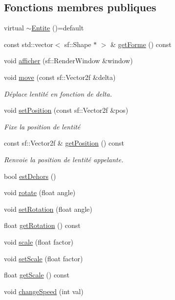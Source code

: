 \subsection*{Fonctions membres publiques}
\begin{DoxyCompactItemize}
\item 
virtual \hyperlink{class_entite_ace3b4604920a7aeba25efb60590e64cb}{$\sim$\+Entite} ()=default
\item 
const std\+::vector$<$ sf\+::\+Shape $\ast$ $>$ \& \hyperlink{class_entite_a0fccfa39c6be09c5ea63fb999fef4c8e}{get\+Forme} () const
\item 
void \hyperlink{class_entite_ad80a88f81ccc689b9abdfa75bd1e99d6}{afficher} (sf\+::\+Render\+Window \&window)
\item 
void \hyperlink{class_entite_ac409613f3cf67cae14babd4b16811c8f}{move} (const sf\+::\+Vector2f \&delta)
\begin{DoxyCompactList}\small\item\em Déplace l\textquotesingle{}entité en fonction de {\itshape delta}. \end{DoxyCompactList}\item 
void \hyperlink{class_entite_aa7fe4a7ebd8eb4c80ef9fdb7d97f2dad}{set\+Position} (const sf\+::\+Vector2f \&pos)
\begin{DoxyCompactList}\small\item\em Fixe la position de l\textquotesingle{}entité \end{DoxyCompactList}\item 
const sf\+::\+Vector2f \& \hyperlink{class_entite_a6f6fd1e1f9f6ad44f0ecc74961a774d9}{get\+Position} () const
\begin{DoxyCompactList}\small\item\em Renvoie la position de l\textquotesingle{}entité appelante. \end{DoxyCompactList}\item 
bool \hyperlink{class_entite_a4d38790ebb4bf082e20e47355a7b2f0c}{est\+Dehors} ()
\item 
void \hyperlink{class_entite_a620502288a6a0fc619eb4cab0fbe2289}{rotate} (float angle)
\item 
void \hyperlink{class_entite_acefaaf63dfe743c73fba1e6143015827}{set\+Rotation} (float angle)
\item 
float \hyperlink{class_entite_af245a50c73da19510d9a9e52cb9248a4}{get\+Rotation} () const
\item 
void \hyperlink{class_entite_a08e80693f0b1293f5a0ab9d04a5aac0e}{scale} (float factor)
\item 
void \hyperlink{class_entite_a3cfd095f6712461cb8c9baa2f6955088}{set\+Scale} (float factor)
\item 
float \hyperlink{class_entite_a95d64960088b9576b94346acd5ad6296}{get\+Scale} () const
\item 
void \hyperlink{class_entite_a88c148848289e34ca3bc991c37db9b44}{change\+Speed} (int val)
\end{DoxyCompactItemize}
